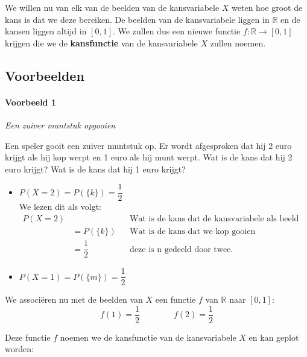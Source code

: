 \documentclass[a4paper,12pt, twoside]{article}
\begin{document}
We willen nu van elk van de beelden van de kansvariabele $X$ weten hoe groot de kans is dat we deze bereiken. De beelden van de kansvariabele liggen in $\mathbb{R}$ en de kansen liggen altijd in $[0,1]$. We zullen dus een nieuwe functie $f:\mathbb{R}\to[0,1]$ krijgen die we de {\bf kansfunctie} van de kansvariabele $X$ zullen noemen.

\subsection{Voorbeelden}

\paragraph*{Voorbeeld 1} {\em Een zuiver muntstuk opgooien}

Een speler gooit een zuiver muntstuk op. Er wordt afgesproken dat hij 2 euro krijgt als hij kop werpt en 1 euro als hij munt werpt. Wat is de kans dat hij 2 euro krijgt? Wat is de kans dat hij 1 euro krijgt?

\begin{itemize}
  \item $P(X=2)=P(\{k\})=\dfrac{1}{2}$\\
  We lezen dit als volgt:
  \begin{align*}
    P(X=2) &              && \mbox{Wat is de kans dat de kansvariabele als beeld 2 heeft}\\
           &=P(\{k\})     && \mbox{Wat is de kans dat we kop gooien}\\
           &=\dfrac{1}{2} && \mbox{deze is n gedeeld door twee.}
  \end{align*}
  \item $P(X=1)=P(\{m\})=\dfrac{1}{2}$
\end{itemize}


We associëren nu met de beelden van $X$ een functie $f$ van $\mathbb{R}$ naar $[0,1]$:
  $$f(1) = \dfrac{1}{2} \qquad\qquad f(2) = \dfrac{1}{2}$$

Deze functie $f$ noemen we de kansfunctie van de kansvariabele $X$ en kan geplot worden:
\begin{center}
\end{center}
\end{document}
